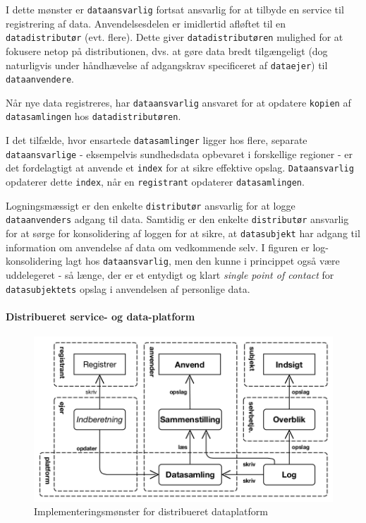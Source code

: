 I dette mønster er \texttt{dataansvarlig} fortsat ansvarlig for at
tilbyde en service til registrering af data. Anvendelsesdelen er
imidlertid afløftet til en \texttt{datadistributør} (evt. flere). Dette
giver \texttt{datadistributøren} mulighed for at fokusere netop på
distributionen, dvs. at gøre data bredt tilgængeligt (dog naturligvis
under håndhævelse af adgangskrav specificeret af \texttt{dataejer}) til
\texttt{dataanvendere}.

Når nye data registreres, har \texttt{dataansvarlig} ansvaret for at
opdatere \texttt{kopien} af \texttt{datasamlingen} hos
\texttt{datadistributøren}.

I det tilfælde, hvor ensartede \texttt{datasamlinger} ligger hos flere,
separate \texttt{dataansvarlige} - eksempelvis sundhedsdata opbevaret i
forskellige regioner - er det fordelagtigt at anvende et \texttt{index}
for at sikre effektive opslag. \texttt{Dataansvarlig} opdaterer dette
\texttt{index}, når en \texttt{registrant} opdaterer
\texttt{datasamlingen}.

Logningsmæssigt er den enkelte \texttt{distributør} ansvarlig for at
logge \texttt{dataanvenders} adgang til data. Samtidig er den enkelte
\texttt{distributør} ansvarlig for at sørge for konsolidering af loggen
for at sikre, at \texttt{datasubjekt} har adgang til information om
anvendelse af data om vedkommende selv. I figuren er log-konsolidering
lagt hos \texttt{dataansvarlig}, men den kunne i princippet også være
uddelegeret - så længe, der er et entydigt og klart \emph{single point
of contact} for \texttt{datasubjektets} opslag i anvendelsen af
personlige data.

\paragraph{Distribueret service- og
data-platform}\label{distribueret-service--og-data-platform}

\begin{figure}
\centering
\includegraphics{figures/use-plat.png}
\caption{Implementeringsmønster for distribueret dataplatform}
\end{figure}

